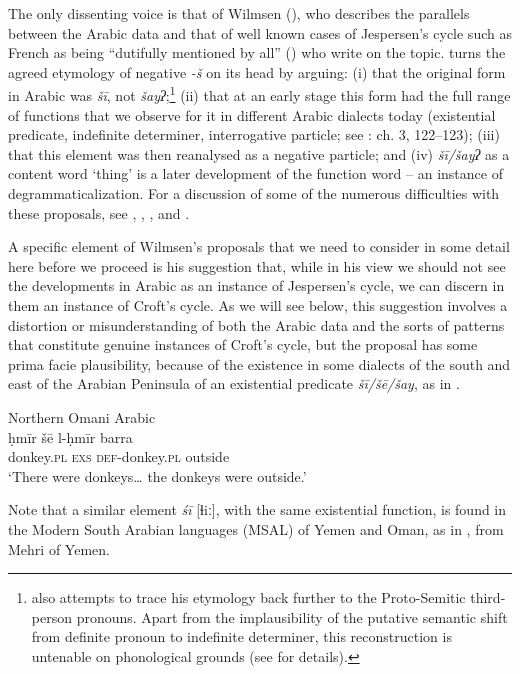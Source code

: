 \documentclass[output=paper]{langsci/langscibook}
\begin{document}
The only dissenting voice is that of Wilmsen (\citeyear{Wilmsen2013,Wilmsen2014}), who describes the parallels between the Arabic data and that of well known cases of Jespersen’s cycle such as French as being “dutifully mentioned by all” (\citeyear[117]{Wilmsen2014}) who write on the topic. \citet{Wilmsen2014} turns the agreed etymology of negative \textit{{}-š} on its head by arguing: (i) that the original form in Arabic was \textit{šī}, not \textit{šayʔ};\footnote{\citet{Wilmsen2014} also attempts to trace his etymology back further to the Proto-Semitic third-person pronouns. Apart from the implausibility of the putative semantic shift from definite pronoun to indefinite determiner, this reconstruction is untenable on phonological grounds (see \citealt{Al-Jallad2015review} for details).} (ii) that at an early stage this form had the full range of functions that we observe for it in different Arabic dialects today (existential predicate, indefinite determiner, interrogative particle; see \citealt{Wilmsen2014}: ch. 3, 122–123); (iii) that this element was then reanalysed as a negative particle; and (iv) \textit{šī/šayʔ} as a content word ‘thing’ is a later development of the function word – an instance of degrammaticalization. For a discussion of some of the numerous difficulties with these proposals, see \citet{Al-Jallad2015review}, \citet{Pat-El2016}, \citet{Souag2016review}, and \citet{Lucas2018}.

A specific element of Wilmsen’s proposals that we need to consider in some detail here before we proceed is his suggestion that, while in his view we should not see the developments in Arabic as an instance of Jespersen’s cycle, we can discern in them an instance of Croft’s cycle. As we will see below, this suggestion involves a distortion or misunderstanding of both the Arabic data and the sorts of patterns that constitute genuine instances of Croft’s cycle, but the proposal has some prima facie plausibility, because of the existence in some dialects of the south and east of the Arabian Peninsula of an existential predicate \textit{šī/šē/šay}, as in . 


\ea\label{oma}
{       Northern Omani Arabic \citep[92]{Eades2009}}\\
\gll ḥmīr šē l-ḥmīr barra\\
     donkey.\textsc{pl} \textsc{exs} \textsc{def-}donkey.\textsc{pl} outside\\
\glt ‘There were donkeys… the donkeys were outside.’
\z

Note that a similar element \textit{śī} [ɬiː], with the same existential function, is found in the Modern South Arabian languages (MSAL) of Yemen and Oman, as in , from Mehri of Yemen.
\end{document}
